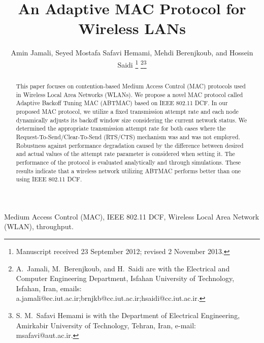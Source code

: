 \documentclass[10pt,twocolumn,oneside,submit]{JCNtran}
\begin{document}



\title{An Adaptive MAC Protocol for Wireless LANs}
\author{Amin Jamali, Seyed Mostafa Safavi Hemami, Mehdi Berenjkoub,
and Hossein Saidi
\thanks{Manuscript received 23 September 2012; revised 2 November 2013.}
\thanks{A.~Jamali, M.~Berenjkoub, and H.~Saidi are with the Electrical and Computer Engineering Department, Isfahan University of Technology, Isfahan, Iran, emails: a.jamali@ec.iut.ac.ir;brnjkb@cc.iut.ac.ir;hsaidi@cc.iut.ac.ir. 
}\thanks{S. M.~Safavi Hemami is with the Department of Electrical Engineering, Amirkabir University of Technology, Tehran, Iran, e-mail: msafavi@aut.ac.ir.}}  \maketitle


\begin{abstract}
This paper focuses on contention-based Medium Access Control (MAC) protocols used in Wireless Local Area Networks (WLANs). We propose a novel MAC protocol called Adaptive Backoff Tuning MAC (ABTMAC) based on IEEE 802.11 DCF. In our proposed MAC protocol, we utilize a fixed transmission attempt rate and each node dynamically adjusts its backoff window size considering the current network status. We determined the appropriate transmission attempt rate for both cases where the Request-To-Send/Clear-To-Send (RTS/CTS) mechanism was and was not employed. Robustness against performance degradation caused by the difference between desired and actual values of the attempt rate parameter is considered when setting it. The performance of the protocol is evaluated analytically and through simulations. These results indicate that a wireless network utilizing ABTMAC performs better than one using IEEE 802.11 DCF.
\end{abstract}

\begin{keywords}
Medium Access Control (MAC), IEEE 802.11 DCF, Wireless Local Area Network (WLAN), throughput.
\end{keywords}
\end{document}
